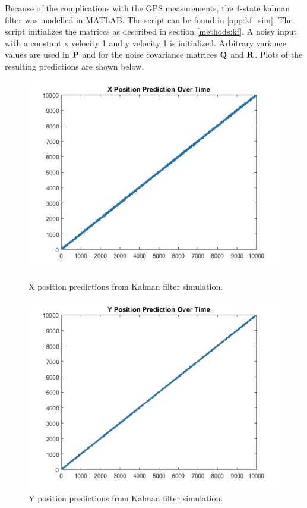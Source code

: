 Because of the complications with the GPS measurements, the 4-state kalman filter
was modelled in MATLAB. The script can be found in \ref{app:kf_sim}. The script 
initializes the matrices as described in section \ref{methods:kf}. A noisy input
with a constant x velocity 1 and y velocity 1 is initialized. Arbitrary variance
values are used in $\mathbf{P}$ and for the noise covariance matrices $\mathbf{Q}$
and $\mathbf{R}$. Plots of the resulting predictions are shown below. 
\begin{figure}[ht!]
\begin{minipage}{.5\textwidth}
  \centering
\includegraphics[scale=0.5]{img/kf_xpos.png}
\caption{X position predictions from Kalman filter simulation.}
\label{fig:kf_xpos}
\end{minipage}
\begin{minipage}{0.5\textwidth}
\centering
\includegraphics[scale=0.5]{img/kf_ypos.png}
\caption{Y position predictions from Kalman filter simulation.}
\label{fig:kf_ypos}
\end{minipage}
\end{figure}
